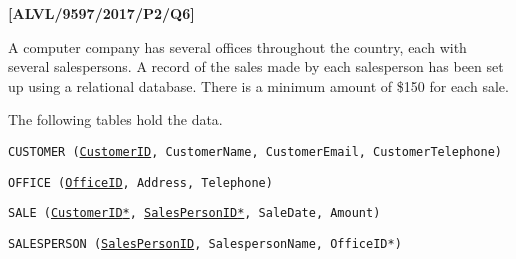 \item \textbf{{[}ALVL/9597/2017/P2/Q6{]} }

A computer company has several offices throughout the country, each
with several salespersons. A record of the sales made by each salesperson
has been set up using a relational database. There is a minimum amount
of \$150 for each sale.

The following tables hold the data. 

\texttt{CUSTOMER (}\texttt{\uline{CustomerID}}\texttt{, CustomerName,
CustomerEmail, CustomerTelephone) }

\texttt{OFFICE (}\texttt{\uline{OfficeID}}\texttt{, Address, Telephone) }

\texttt{SALE (}\texttt{\uline{CustomerID{*}}}\texttt{, }\texttt{\uline{SalesPersonID{*}}}\texttt{,
SaleDate, Amount) }

\texttt{SALESPERSON (}\texttt{\uline{SalesPersonID}}\texttt{, SalespersonName,
OfficeID{*}) }

